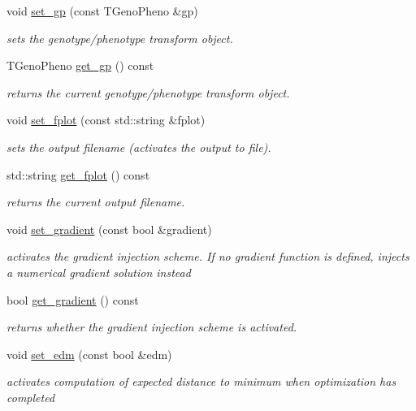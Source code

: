 \begin{DoxyCompactItemize}
void \hyperlink{classlibcmaes_1_1Parameters_aeeab862124b864147e143bd86eb51cb5}{set\-\_\-gp} (const T\-Geno\-Pheno \&gp)
\begin{DoxyCompactList}\small\item\em sets the genotype/phenotype transform object. \end{DoxyCompactList}\item 
T\-Geno\-Pheno \hyperlink{classlibcmaes_1_1Parameters_a365039e6948ee2242c0ad34ed4ff02ab}{get\-\_\-gp} () const 
\begin{DoxyCompactList}\small\item\em returns the current genotype/phenotype transform object. \end{DoxyCompactList}\item 
void \hyperlink{classlibcmaes_1_1Parameters_ab96a2149ca63863d3f5618f54097df44}{set\-\_\-fplot} (const std\-::string \&fplot)
\begin{DoxyCompactList}\small\item\em sets the output filename (activates the output to file). \end{DoxyCompactList}\item 
std\-::string \hyperlink{classlibcmaes_1_1Parameters_a6787bd16e95db6125a5e131ad58574cc}{get\-\_\-fplot} () const 
\begin{DoxyCompactList}\small\item\em returns the current output filename. \end{DoxyCompactList}\item 
void \hyperlink{classlibcmaes_1_1Parameters_a38082ad1568c356caff5b299d6faea11}{set\-\_\-gradient} (const bool \&gradient)
\begin{DoxyCompactList}\small\item\em activates the gradient injection scheme. If no gradient function is defined, injects a numerical gradient solution instead \end{DoxyCompactList}\item 
bool \hyperlink{classlibcmaes_1_1Parameters_ac7f6c27e00d1c0d744221b5a32e9efee}{get\-\_\-gradient} () const 
\begin{DoxyCompactList}\small\item\em returns whether the gradient injection scheme is activated. \end{DoxyCompactList}\item 
void \hyperlink{classlibcmaes_1_1Parameters_ac34068e69a36d06fed6599a7247bcb2e}{set\-\_\-edm} (const bool \&edm)
\begin{DoxyCompactList}\small\item\em activates computation of expected distance to minimum when optimization has completed \end{DoxyCompactList}\item 

\end{DoxyCompactItemize}
